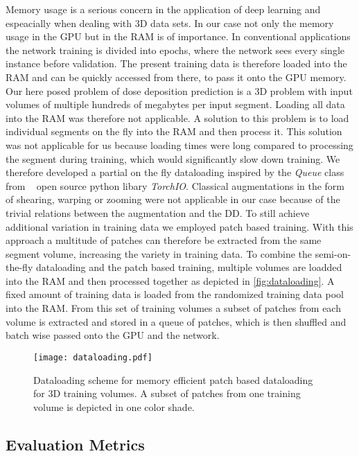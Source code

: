 Memory usage is a serious concern in the application of deep learning and espeacially when dealing with 3D data sets. 
In our case not only the memory usage in the \ac{GPU} but in the \ac{RAM} is of importance. 
In conventional applications the network training is divided into epochs, where the network sees every single instance before validation.
The present training data is therefore loaded into the \acs{RAM} and can be quickly accessed from there, to pass it onto the \acs{GPU} memory.
Our here posed problem of dose deposition prediction is a 3D problem with input volumes of multiple hundreds of megabytes per input segment.
Loading all data into the \acs{RAM} was therefore not applicable. 
A solution to this problem is to load individual segments on the fly into the RAM and then process it.
This solution was not applicable for us because loading times were long compared to processing the segment during training, which would significantly slow down training.
We therefore developed a partial on the fly dataloading inspired by the \emph{Queue} class from \citeauthor{perez-garcia_torchio_2021}~\cite{perez-garcia_torchio_2021} open source python libary \emph{TorchIO}.
Classical augmentations in the form of shearing, warping or zooming were not applicable in our case because of the trivial relations between the augmentation and the \acs{DD}.
To still achieve additional variation in training data we employed patch based training. 
With this approach a multitude of patches can therefore be extracted from the same segment volume, increasing the variety in training data.
To combine the semi-on-the-fly dataloading and the patch based training, multiple volumes are loadded into the RAM and then processed together as depicted in \autoref{fig:dataloading}. 
A fixed amount of training data is loaded from the randomized training data pool into the \acs{RAM}. 
From this set of training volumes a subset of patches from each volume is extracted and stored in a queue of patches, which is then shuffled and batch wise passed onto the \acs{GPU} and the network. 

\begin{figure}
    \centering
    \texttt{[image: dataloading.pdf]}
    \caption{Dataloading scheme for memory efficient patch based dataloading for 3D training volumes. A subset of patches from one training volume is depicted in one color shade.}\label{fig:dataloading}
\end{figure}

\subsection{Evaluation Metrics}

